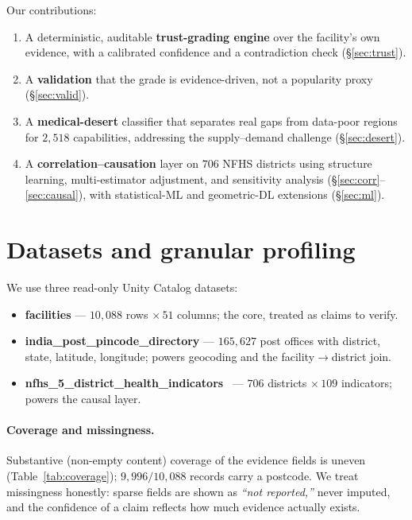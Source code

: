 \documentclass[11pt]{article}
\begin{document}
Our contributions:
\begin{enumerate}[leftmargin=1.4em,itemsep=1pt]
\item A deterministic, auditable \textbf{trust-grading engine} over the facility's own evidence, with a calibrated confidence and a contradiction check (\S\ref{sec:trust}).
\item A \textbf{validation} that the grade is evidence-driven, not a popularity proxy (\S\ref{sec:valid}).
\item A \textbf{medical-desert} classifier that separates real gaps from data-poor regions for $2{,}518$ capabilities, addressing the supply--demand challenge (\S\ref{sec:desert}).
\item A \textbf{correlation--causation} layer on $706$ NFHS districts using structure learning, multi-estimator adjustment, and sensitivity analysis (\S\ref{sec:corr}--\ref{sec:causal}), with statistical-ML and geometric-DL extensions (\S\ref{sec:ml}).
\end{enumerate}

\section{Datasets and granular profiling}
We use three read-only Unity Catalog datasets:
\begin{itemize}[leftmargin=1.4em,itemsep=1pt]
\item \textbf{facilities} --- $10{,}088$ rows $\times\,51$ columns; the core, treated as claims to verify.
\item \textbf{india\_post\_pincode\_directory} --- $165{,}627$ post offices with district, state, latitude, longitude; powers geocoding and the facility$\to$district join.
\item \textbf{nfhs\_5\_district\_health\_indicators}~\cite{nfhs5} --- $706$ districts $\times\,109$ indicators; powers the causal layer.
\end{itemize}

\paragraph{Coverage and missingness.} Substantive (non-empty content) coverage of the evidence fields is uneven (Table~\ref{tab:coverage}); $9{,}996/10{,}088$ records carry a postcode. We treat missingness honestly: sparse fields are shown as \emph{``not reported,''} never imputed, and the confidence of a claim reflects how much evidence actually exists.
\end{document}
